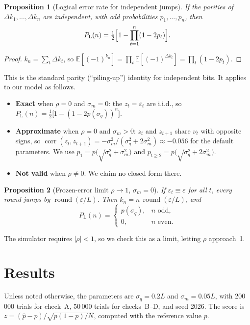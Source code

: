 \documentclass[11pt,letterpaper]{article}
\newtheorem{proposition}{Proposition}
\DeclareMathOperator{\rnd}{round}
\DeclareMathOperator{\corr}{corr}
\newcommand{\PL}{P_{\mathrm{L}}}
\begin{document}
\begin{proposition}[Logical error rate for independent jumps]\label{prop:parity}
If the parities of $\Delta k_1,\dots,\Delta k_n$ are independent, with odd
probabilities $p_1,\dots,p_n$, then
\[
  \PL(n)=\tfrac12\Bigl[1-\prod_{t=1}^{n}(1-2p_t)\Bigr].
\]
\end{proposition}
\begin{proof}
$k_n=\sum_t\Delta k_t$, so
$\mathbb E[(-1)^{k_n}]=\prod_t\mathbb E[(-1)^{\Delta k_t}]=\prod_t(1-2p_t)$.
\end{proof}

This is the standard parity (``piling-up'') identity for independent bits. It
applies to our model as follows.
\begin{itemize}
  \item \textbf{Exact} when $\rho=0$ and $\sigma_m=0$: the $z_t=\varepsilon_t$ are
    i.i.d., so $\PL(n)=\frac12\bigl[1-(1-2p(\sigma_q))^n\bigr]$.
  \item \textbf{Approximate} when $\rho=0$ and $\sigma_m>0$: $z_t$ and $z_{t+1}$
    share $\nu_t$ with opposite signs, so
    $\corr(z_t,z_{t+1})=-\sigma_m^2/(\sigma_q^2+2\sigma_m^2)\approx-0.056$ for
    the default parameters. We use $p_1=p\bigl(\sqrt{\sigma_q^2+\sigma_m^2}\bigr)$
    and $p_{t\ge2}=p\bigl(\sqrt{\sigma_q^2+2\sigma_m^2}\bigr)$.
  \item \textbf{Not valid} when $\rho\ne0$. We claim no closed form there.
\end{itemize}

\begin{proposition}[Frozen-error limit $\rho\to1$, $\sigma_m=0$]\label{prop:frozen}
If $\varepsilon_t\equiv\varepsilon$ for all $t$, every round jumps by
$\rnd(\varepsilon/L)$. Then $k_n=n\,\rnd(\varepsilon/L)$, and
\[
  \PL(n)=
  \begin{cases}
    p(\sigma_q), & n\text{ odd},\\
    0, & n\text{ even}.
  \end{cases}
\]
\end{proposition}
The simulator requires $|\rho|<1$, so we check this as a limit, letting
$\rho$ approach~1.

\section{Results}

Unless noted otherwise, the parameters are $\sigma_q=0.2L$ and
$\sigma_m=0.05L$, with 200\,000 trials for check~A, 50\,000 trials for
checks~B--D, and seed 2026. The score is
$z=(\hat p-p)/\sqrt{p(1-p)/N}$, computed with the reference value $p$.
\end{document}
